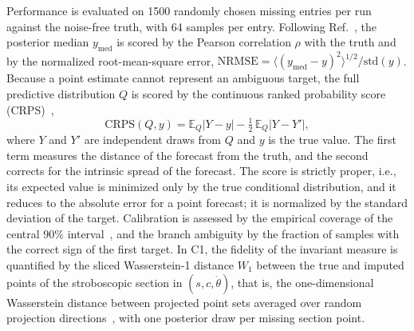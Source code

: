 Performance is evaluated on 1500 randomly chosen missing entries per run against the noise-free truth, with 64 samples per entry. Following Ref.~, the posterior median $y_{\mathrm{med}}$ is scored by the Pearson correlation $\rho$ with the truth and by the normalized root-mean-square error, $\mathrm{NRMSE}=\langle(y_{\mathrm{med}}-y)^{2}\rangle^{1/2}/\mathrm{std}(y)$. Because a point estimate cannot represent an ambiguous target, the full predictive distribution $Q$ is scored by the continuous ranked probability score (CRPS)~\cite{Gneiting2007},
\begin{equation}
\mathrm{CRPS}(Q,y) = \mathbb E_Q|Y-y| - \tfrac12\,\mathbb E_Q|Y-Y'| ,
\label{eq:crps}
\end{equation}
where $Y$ and $Y'$ are independent draws from $Q$ and $y$ is the true value. The first term measures the distance of the forecast from the truth, and the second corrects for the intrinsic spread of the forecast. The score is strictly proper, i.e., its expected value is minimized only by the true conditional distribution, and it reduces to the absolute error for a point forecast; it is normalized by the standard deviation of the target. Calibration is assessed by the empirical coverage of the central $90\%$ interval~\cite{GneitingBalabdaoui2007}, and the branch ambiguity by the fraction of samples with the correct sign of the first target. In C1, the fidelity of the invariant measure is quantified by the sliced Wasserstein-1 distance $W_1$ between the true and imputed points of the stroboscopic section in $(s,c,\dot\theta)$, that is, the one-dimensional Wasserstein distance between projected point sets averaged over random projection directions~\cite{Bonneel2015}, with one posterior draw per missing section point.
